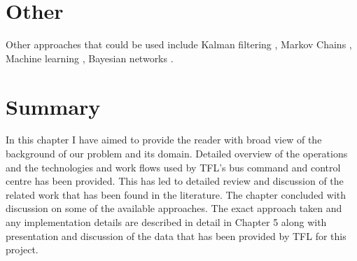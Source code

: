 \section{Other}
Other approaches that could be used include Kalman filtering \cite{kalmanFiltering} \cite{Guo201450}, Markov Chains \cite{Qi201495} \cite{Ramezani20121576}, Machine learning \cite{herring2010real}, Bayesian networks \cite{Wang201479}. 




\section{Summary}
In this chapter I have aimed to provide the reader with broad view of the background of our problem and its domain. Detailed overview of the operations and the technologies and work flows used by TFL's bus command and control centre has been provided. This has led to detailed review and discussion of the related work that has been found in the literature. The chapter concluded with discussion on some of the available approaches. The exact approach taken and any implementation details are described in detail in Chapter 5 along with presentation and discussion of the data that has been provided by TFL for this project.